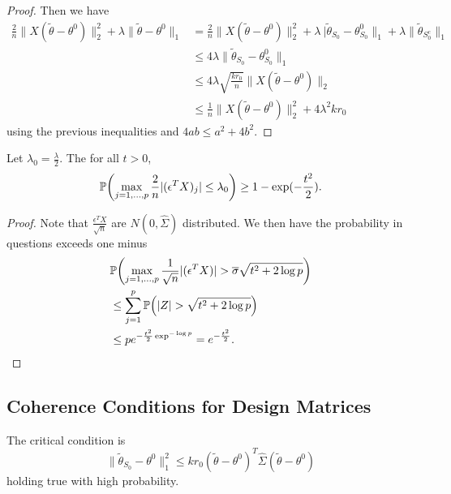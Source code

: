 \begin{proof}
  Then we have
  \begin{align}
    \label{eq:64}
    \frac{2}{n} \| X(\tilde \theta - \theta^{0})\|_{2}^{2} + \lambda
    \| \tilde \theta - \theta^{0} \|_{1} &= \frac{2}{n} \| X(\tilde
    \theta - \theta^{0}) \|_{2}^{2} + \lambda\ |\tilde \theta_{S_{0}}
    - \theta^{0}_{S_{0}} \|_{1} + \lambda \| \tilde \theta_{S_{0}^{c}}
    \|_{1} \\
    &\leq 4 \lambda \| \tilde \theta_{S_{0}} - \theta^{0}_{S_{0}}
    \|_{1} \\
    &\leq 4 \lambda \sqrt{\frac{kr_{0}}{n}} \| X(\tilde \theta -
    \theta^{0}) \|_{2} \\
    &\leq \frac{1}{n} \| X(\tilde \theta - \theta^{0}) \|_{2}^{2} + 4
    \lambda^{2} k r_{0}
  \end{align} using the previous inequalities and $4ab \leq a^{2} + 4b^{2}$.
\end{proof}

\begin{thm}
  Let $\lambda_{0} = \frac{\lambda}{2}$.  The for all $t > 0$,
  \begin{equation}
    \label{eq:35}
    \Prob{\max_{j = 1, \dots, p} \frac{2}{n} |(\epsilon^{T} X)_{j}|
      \leq \lambda_{0}} \geq 1 - \exp(-\frac{t^{2}}{2}).
  \end{equation}
\end{thm}

\begin{proof}
  Note that $\frac{\epsilon^{T} X}{\sqrt{n}}$ are $N(0, \hat \Sigma)$
  distributed.  We then have the probability in questions exceeds one
  minus
  \begin{align}
    \label{eq:65}
    &\Prob{\max_{j = 1, \dots, p} \frac{1}{\sqrt{n}} |(\epsilon^{T} X)
      | > \overline \sigma \sqrt{t^{2} + 2 \log p}} \\
    &\leq \sum_{j=1}^{p} \Prob{|Z| > \sqrt{t^{2} + 2 \log p}} \\
    &\leq pe^{-\frac{t^{2}}{2} \exp^{-\log p}} = e^{-\frac{t^{2}}{2}}.
  \end{align}
\end{proof}

\subsection{Coherence Conditions for Design Matrices}
\label{sec:coher-cond-design}

The critical condition is
\begin{equation}
  \label{eq:36}
  \| \tilde \theta_{S_{0}} - \theta^{0} \|_{1}^{2} \leq k r_{0}(\tilde
  \theta - \theta^{0})^{T} \hat \Sigma (\tilde \theta - \theta^{0})
\end{equation} holding true with high probability.

